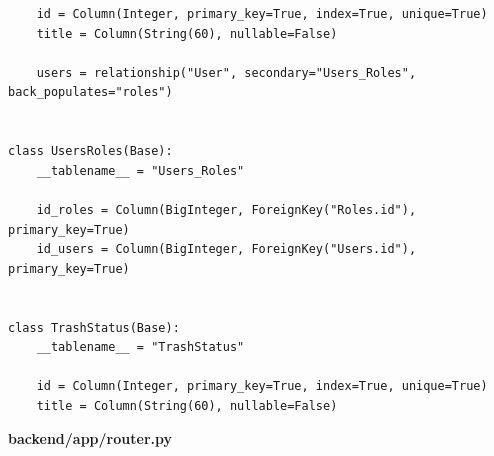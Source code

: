 \documentclass[coursework]{SCWorks}
\begin{document}
\begin{verbatim}
    id = Column(Integer, primary_key=True, index=True, unique=True)
    title = Column(String(60), nullable=False)

    users = relationship("User", secondary="Users_Roles", back_populates="roles")


class UsersRoles(Base):
    __tablename__ = "Users_Roles"

    id_roles = Column(BigInteger, ForeignKey("Roles.id"), primary_key=True)
    id_users = Column(BigInteger, ForeignKey("Users.id"), primary_key=True)


class TrashStatus(Base):
    __tablename__ = "TrashStatus"

    id = Column(Integer, primary_key=True, index=True, unique=True)
    title = Column(String(60), nullable=False)

\end{verbatim}

\begin{center}
\textbf{backend/app/router.py}
\end{center}
\end{document}
